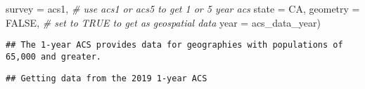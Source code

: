 \documentclass[
]{article}
\newenvironment{Shaded}{\begin{snugshade}}{\end{snugshade}}
\newcommand{\AttributeTok}[1]{\textcolor[rgb]{0.77,0.63,0.00}{#1}}
\newcommand{\CommentTok}[1]{\textcolor[rgb]{0.56,0.35,0.01}{\textit{#1}}}
\newcommand{\ConstantTok}[1]{\textcolor[rgb]{0.00,0.00,0.00}{#1}}
\newcommand{\NormalTok}[1]{#1}
\newcommand{\StringTok}[1]{\textcolor[rgb]{0.31,0.60,0.02}{#1}}
\begin{document}
\begin{Shaded}
\begin{Highlighting}[]
                        \AttributeTok{survey =} \StringTok{\textquotesingle{}acs1\textquotesingle{}}\NormalTok{, }\CommentTok{\# use \textquotesingle{}acs1\textquotesingle{} or \textquotesingle{}acs5\textquotesingle{} to get 1 or 5 year acs}
                        \AttributeTok{state =} \StringTok{\textquotesingle{}CA\textquotesingle{}}\NormalTok{, }
                        \AttributeTok{geometry =} \ConstantTok{FALSE}\NormalTok{, }\CommentTok{\# set to TRUE to get as geospatial data}
                        \AttributeTok{year =}\NormalTok{ acs\_data\_year)}
\end{Highlighting}
\end{Shaded}

\begin{verbatim}
## The 1-year ACS provides data for geographies with populations of 65,000 and greater.
\end{verbatim}

\begin{verbatim}
## Getting data from the 2019 1-year ACS
\end{verbatim}
\end{document}
